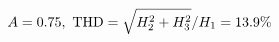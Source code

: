 \documentclass[preview]{standalone}
\begin{document}
\begin{align*}
\special{dvisvgm:raw <g id='unique000'>}A=0.75,\ \text{THD}=\sqrt{H_2^2+H_3^2}/H_1=13.9\%\special{dvisvgm:raw </g>}
\end{align*}
\end{document}
